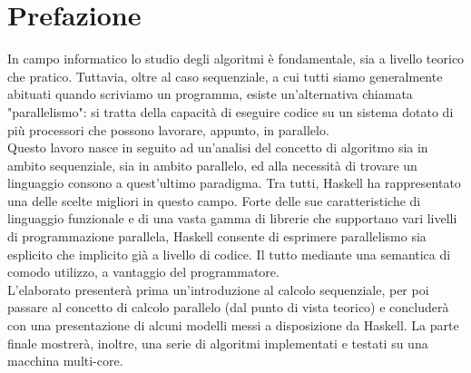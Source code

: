 \chapter*{Prefazione}
In campo informatico lo studio degli algoritmi è fondamentale, sia a livello teorico che pratico. Tuttavia, oltre al caso sequenziale, a cui tutti siamo generalmente abituati quando scriviamo un programma, esiste un'alternativa chiamata "parallelismo": si tratta della capacità di eseguire codice su un sistema dotato di più processori che possono lavorare, appunto, in parallelo.\\
Questo lavoro nasce in seguito ad un'analisi del concetto di algoritmo sia in ambito sequenziale, sia in ambito parallelo, ed alla necessità di trovare un linguaggio consono a quest'ultimo paradigma. Tra tutti, Haskell ha rappresentato una delle scelte migliori in questo campo. Forte delle sue caratteristiche di linguaggio funzionale e di una vasta gamma di librerie che supportano vari livelli di programmazione parallela, Haskell consente di esprimere parallelismo sia esplicito che implicito già a livello di codice. Il tutto mediante una semantica di comodo utilizzo, a vantaggio del programmatore.\\
L'elaborato presenterà prima un'introduzione al calcolo sequenziale, per poi passare al concetto di calcolo parallelo (dal punto di vista teorico) e concluderà con una presentazione di alcuni modelli messi a disposizione da Haskell. La parte finale mostrerà, inoltre, una serie di algoritmi implementati e testati su una macchina multi-core.